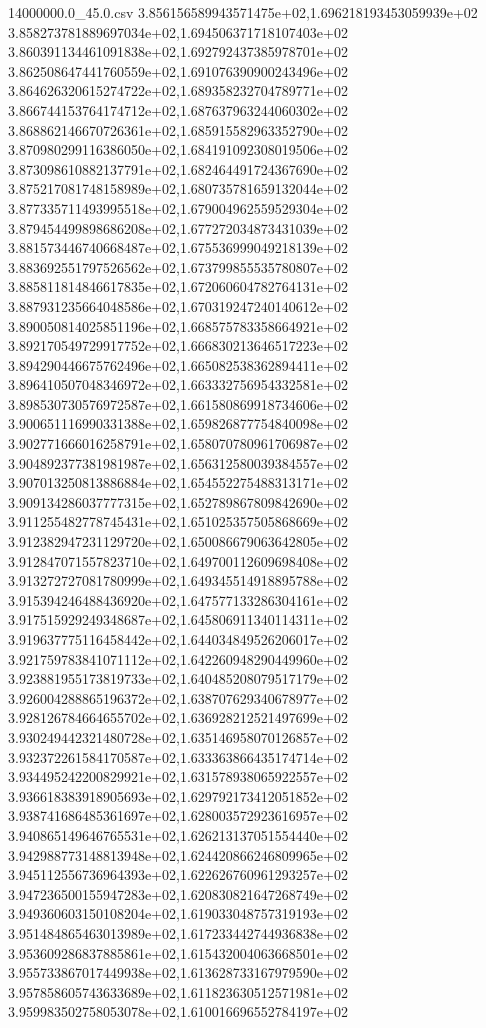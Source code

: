 \begin{filecontents*}{14000000.0_45.0.csv}
3.856156589943571475e+02,1.696218193453059939e+02
3.858273781889697034e+02,1.694506371718107403e+02
3.860391134461091838e+02,1.692792437385978701e+02
3.862508647441760559e+02,1.691076390900243496e+02
3.864626320615274722e+02,1.689358232704789771e+02
3.866744153764174712e+02,1.687637963244060302e+02
3.868862146670726361e+02,1.685915582963352790e+02
3.870980299116386050e+02,1.684191092308019506e+02
3.873098610882137791e+02,1.682464491724367690e+02
3.875217081748158989e+02,1.680735781659132044e+02
3.877335711493995518e+02,1.679004962559529304e+02
3.879454499898686208e+02,1.677272034873431039e+02
3.881573446740668487e+02,1.675536999049218139e+02
3.883692551797526562e+02,1.673799855535780807e+02
3.885811814846617835e+02,1.672060604782764131e+02
3.887931235664048586e+02,1.670319247240140612e+02
3.890050814025851196e+02,1.668575783358664921e+02
3.892170549729917752e+02,1.666830213646517223e+02
3.894290446675762496e+02,1.665082538362894411e+02
3.896410507048346972e+02,1.663332756954332581e+02
3.898530730576972587e+02,1.661580869918734606e+02
3.900651116990331388e+02,1.659826877754840098e+02
3.902771666016258791e+02,1.658070780961706987e+02
3.904892377381981987e+02,1.656312580039384557e+02
3.907013250813886884e+02,1.654552275488313171e+02
3.909134286037777315e+02,1.652789867809842690e+02
3.911255482778745431e+02,1.651025357505868669e+02
3.912382947231129720e+02,1.650086679063642805e+02
3.912847071557823710e+02,1.649700112609698408e+02
3.913272727081780999e+02,1.649345514918895788e+02
3.915394246488436920e+02,1.647577133286304161e+02
3.917515929249348687e+02,1.645806911340114311e+02
3.919637775116458442e+02,1.644034849526206017e+02
3.921759783841071112e+02,1.642260948290449960e+02
3.923881955173819733e+02,1.640485208079517179e+02
3.926004288865196372e+02,1.638707629340678977e+02
3.928126784664655702e+02,1.636928212521497699e+02
3.930249442321480728e+02,1.635146958070126857e+02
3.932372261584170587e+02,1.633363866435174714e+02
3.934495242200829921e+02,1.631578938065922557e+02
3.936618383918905693e+02,1.629792173412051852e+02
3.938741686485361697e+02,1.628003572923616957e+02
3.940865149646765531e+02,1.626213137051554440e+02
3.942988773148813948e+02,1.624420866246809965e+02
3.945112556736964393e+02,1.622626760961293257e+02
3.947236500155947283e+02,1.620830821647268749e+02
3.949360603150108204e+02,1.619033048757319193e+02
3.951484865463013989e+02,1.617233442744936838e+02
3.953609286837885861e+02,1.615432004063668501e+02
3.955733867017449938e+02,1.613628733167979590e+02
3.957858605743633689e+02,1.611823630512571981e+02
3.959983502758053078e+02,1.610016696552784197e+02

\end{filecontents*}
